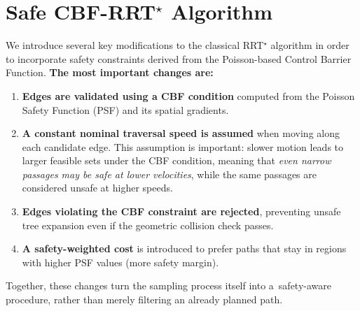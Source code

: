 \documentclass[letterpaper, 10 pt, conference]{ieeeconf}
\begin{document}
\section{Safe CBF-RRT$^\star$ Algorithm}
We introduce several key modifications to the classical RRT$^\star$
algorithm in order to incorporate safety constraints derived from
the Poisson-based Control Barrier Function.
\textbf{The most important changes are:}
\begin{enumerate}
    \item \textbf{Edges are validated using a CBF condition} computed
    from the Poisson Safety Function (PSF) and its spatial gradients.

    \item \textbf{A constant nominal traversal speed is assumed} when
    moving along each candidate edge. This assumption is important: 
    slower motion leads to larger feasible sets under the CBF condition,
    meaning that \emph{even narrow passages may be safe at lower velocities},
    while the same passages are considered unsafe at higher speeds.

    \item \textbf{Edges violating the CBF constraint are rejected},
    preventing unsafe tree expansion even if the geometric collision
    check passes.

    \item \textbf{A safety-weighted cost} is introduced to prefer paths
    that stay in regions with higher PSF values (more safety margin).
\end{enumerate}

Together, these changes turn the sampling process itself into
a~safety-aware procedure, rather than merely filtering an already planned path.

\end{document}
